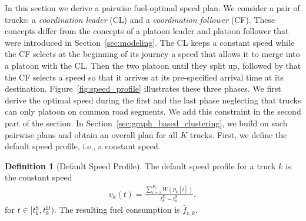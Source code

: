 \documentclass[letterpaper,10pt,conference,twocolumn]{IEEEtran}
\newcommand{\op}[1]{\mathrm{#1}}
\theoremstyle{definition}
\newtheorem{defi}{Definition}
\begin{document}
In this section we derive a pairwise fuel-optimal speed plan. We consider a pair of trucks: a \textit{coordination leader} (CL) and a \textit{coordination follower} (CF). These concepts differ from the concepts of a platoon leader and platoon follower that were introduced in Section~\ref{sec:modeling}. The CL keeps a constant speed while the CF selects at the beginning of its journey a speed that allows it to merge into a platoon with the CL. Then the two platoon until they split up, followed by that the CF selects a speed so that it arrives at its pre-specified arrival time at its destination. Figure~\ref{fig:speed_profile} illustrates these three phases. We first derive the optimal speed during the first and the last phase neglecting that trucks can only platoon on common road segments. We add this constraint in the second part of the section. In Section~\ref{sec:graph_based_clustering}, we build on such pairwise plans and obtain an overall plan for all $K$ trucks. First, we define the default speed profile, i.e., a constant speed.
\begin{defi}[Default Speed Profile]
The default speed profile for a truck $k$ is the constant speed
\begin{align}
 v_{k}(t) = \frac{ \sum\limits_{i=1}^{P_k} W(\bar{p}_k[i]) }{ t_{k}^\op{D} - t_{k}^\op{S}}, \label{eq:leader_velocity}
\end{align}
for $t \in [t_k^\op{S},t_k^\op{D})$.
The resulting fuel consumption is $\bar{f}_{\op{c},k}$. 
\end{defi}
\end{document}
